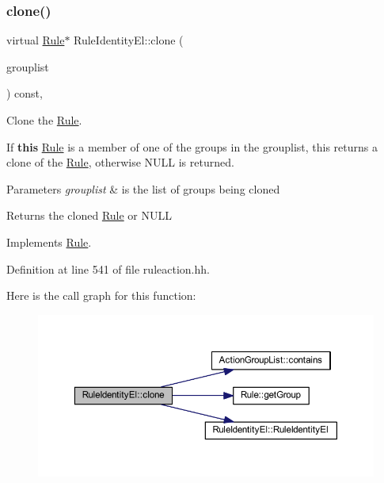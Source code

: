 \subsubsection{\texorpdfstring{clone()}{clone()}}
{\footnotesize\ttfamily virtual \mbox{\hyperlink{class_rule}{Rule}}$\ast$ Rule\+Identity\+El\+::clone (\begin{DoxyParamCaption}\item[{const \mbox{\hyperlink{class_action_group_list}{Action\+Group\+List}} \&}]{grouplist }\end{DoxyParamCaption}) const\hspace{0.3cm}{\ttfamily [inline]}, {\ttfamily [virtual]}}



Clone the \mbox{\hyperlink{class_rule}{Rule}}. 

If {\bfseries{this}} \mbox{\hyperlink{class_rule}{Rule}} is a member of one of the groups in the grouplist, this returns a clone of the \mbox{\hyperlink{class_rule}{Rule}}, otherwise N\+U\+LL is returned. 
\begin{DoxyParams}{Parameters}
{\em grouplist} & is the list of groups being cloned \\
\hline
\end{DoxyParams}
\begin{DoxyReturn}{Returns}
the cloned \mbox{\hyperlink{class_rule}{Rule}} or N\+U\+LL 
\end{DoxyReturn}


Implements \mbox{\hyperlink{class_rule_a70de90a76461bfa7ea0b575ce3c11e4d}{Rule}}.



Definition at line 541 of file ruleaction.\+hh.

Here is the call graph for this function\+:
\nopagebreak
\begin{figure}[H]
\begin{center}
\leavevmode
\includegraphics[width=350pt]{class_rule_identity_el_acacffc41cdb3a56a693132b9b6de63d0_cgraph}
\end{center}
\end{figure}
\mbox{\label{class_rule_identity_el_a7fff34176e6dff46c8f7acf4aae30bcf}} 
